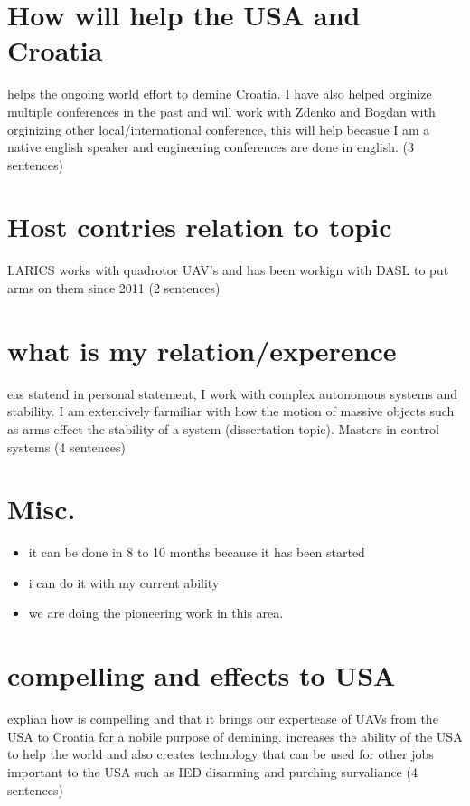 \documentclass[12pt]{article}
\begin{document}
\section{How will help the USA and Croatia}
helps the ongoing world effort to demine Croatia.  I have also helped orginize multiple conferences in 
the past and will work with Zdenko and Bogdan with orginizing other local/international conference, 
this will help becasue I am a native english speaker and engineering conferences are done in english. 
(3 sentences)

\section{Host contries relation to topic}
LARICS works with quadrotor UAV's and has been workign with DASL to put arms on them since 2011 
(2 sentences)

\section{what is my relation/experence}
eas statend in personal statement, I work with complex autonomous systems and stability.  I am 
extencively farmiliar with how the motion of massive objects such as arms effect the stability of a system 
(dissertation topic).  Masters in control systems  (4 sentences)

\section{Misc.}
\begin{itemize}
\item it can be done in 8 to 10 months because it has been started
\item i can do it with my current ability
\item we are doing the pioneering work in this area.
\end{itemize}

\section{compelling and effects to USA}
explian how is compelling and that it brings our expertease of UAVs from the USA to Croatia for a 
nobile purpose of demining.  increases the ability of the USA to help the world and also creates 
technology that can be used for other jobs important to the USA such as IED disarming and purching 
survaliance (4 sentences)
\end{document}
